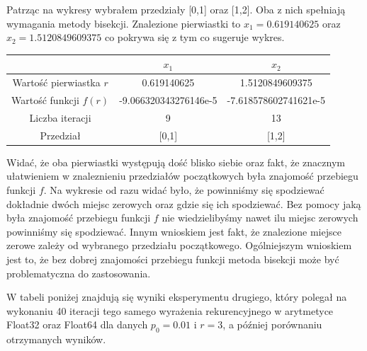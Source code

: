 \documentclass[]{article}
\begin{document}
	Patrząc na wykresy wybrałem przedziały [0,1] oraz [1,2]. Oba z nich spełniają wymagania metody bisekcji. Znalezione pierwiastki to $x_1=0.619140625$ oraz $x_2=1.5120849609375$ co pokrywa się z tym co sugeruje wykres.
	
	
	\begin{table}[!h]
		\centering
		\label{tab:table1}
		\begin{tabular}{c|c|c}
			
			 & $x_1$ & $x_2$ \\ \hline
			Wartość pierwiastka $r$ &  0.619140625 & 1.5120849609375 \\ 
			Wartość funkcji $f(r)$ & -9.066320343276146e-5 & -7.618578602741621e-5  \\ 
			Liczba iteracji & 9 & 13 \\
			Przedział & [0,1] & [1,2] \\
		\end{tabular}
	\end{table}

	Widać, że oba pierwiastki występują dość blisko siebie oraz fakt, że znacznym ułatwieniem w znaleznieniu przedziałów początkowych była znajomość przebiegu funkcji $f$. Na wykresie od razu widać było, że powinniśmy się spodziewać dokładnie dwóch miejsc zerowych oraz gdzie się ich spodziewać. Bez pomocy jaką była znajomość przebiegu funkcji $f$ nie wiedzielibyśmy nawet ilu miejsc zerowych powinniśmy się spodziewać. Innym wnioskiem jest fakt, że znalezione miejsce zerowe zależy od wybranego przedziału początkowego. Ogólniejszym wnioskiem jest to, że bez dobrej znajomości przebiegu funkcji metoda bisekcji może być problematyczna do zastosowania. 

	\clearpage

	W tabeli poniżej znajdują się wyniki eksperymentu drugiego, który polegał na wykonaniu 40 iteracji tego samego wyrażenia rekurencyjnego w arytmetyce Float32 oraz Float64 dla danych $p_0 = 0.01$ i $r = 3$, a później porównaniu otrzymanych wyników.
\end{document}
